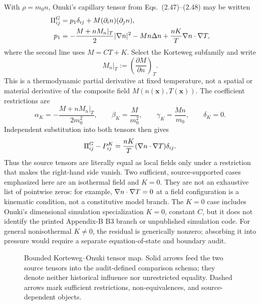 With \(\rho=m_0n\), Onuki's capillary tensor from Eqs.~(2.47)--(2.48) may be
written
\begin{align}
 \Pi^G_{ij}
 &=p_1\delta_{ij}+M(\partial_in)(\partial_jn), \\
 p_1
 &=-\frac{M+nM_n|_T}{2}|\nabla n|^2-Mn\Delta n
   +\frac{nK}{T}\nabla n\cdot\nabla T,
 \label{eq:onuki-capillary-expanded-for-korteweg}
\end{align}
where the second line uses \(M=CT+K\).  Select the Korteweg subfamily
and write
\[
 M_n|_T:=\left(\frac{\partial M}{\partial n}\right)_T .
\]
This is a thermodynamic partial derivative at fixed temperature, not a spatial
or material derivative of the composite field \(M(n(\boldsymbol{x}),T(\boldsymbol{x}))\).
The coefficient restrictions are
\begin{equation}
 \alpha_K=-\frac{M+nM_n|_T}{2m_0^2},\qquad
 \beta_K=\frac{M}{m_0^2},\qquad
 \gamma_K=\frac{Mn}{m_0},\qquad
 \delta_K=0 .
 \label{eq:korteweg-onuki-map}
\end{equation}
Independent substitution into both tensors then gives
\begin{equation}
 \Pi^G_{ij}-P^K_{ij}
 =\frac{nK}{T}(\nabla n\cdot\nabla T)\delta_{ij}.
 \label{eq:korteweg-onuki-residual}
\end{equation}
Thus the source tensors are literally equal as local fields only under a
restriction that makes the right-hand side vanish.  Two sufficient,
source-supported cases emphasized here are an isothermal field and \(K=0\).
They are not an exhaustive list of pointwise zeros: for example,
\(\nabla n\cdot\nabla T=0\) at a field configuration is a kinematic condition,
not a constitutive model branch.  The \(K=0\) case includes Onuki's dimensional
simulation specialization \(K=0\), constant \(C\), but it does not identify the
printed Appendix-B B3 branch or unpublished simulation code.  For general
nonisothermal \(K\ne0\), the residual is generically nonzero; absorbing it into
pressure would require a separate equation-of-state and boundary audit.

\begin{figure}[htbp]
\centering

\caption{Bounded Korteweg--Onuki tensor map.  Solid arrows feed the two source
tensors into the audit-defined comparison schema; they denote neither
historical influence nor unrestricted equality.  Dashed arrows mark sufficient
restrictions, non-equivalences, and source-dependent
objects.}
\label{fig:korteweg-onuki-tensor-map}
\end{figure}

